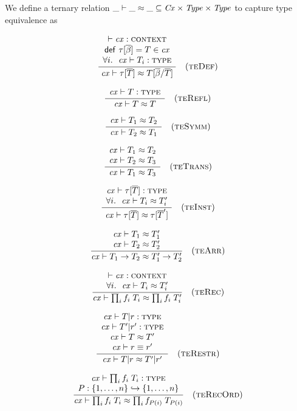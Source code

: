 We define a ternary relation $\ternrel{\teqY}{\Cx}{\Typ}{\Typ}$ to capture
type equivalence as

\[
\rruleIII
 {\cxwfO}
 {\tdefO\in\cx}
 {\FORALL{i}{\istyO{\typ_i}}}
 {\teqO{\tinstO}{\tsbslash{\typ}{\tvarS}{\typS}}}
 {\Rtedef}
\]

\[
\rruleI
 {\istyO{\typ}}
 {\teqO{\typ}{\typ}}
 {\Rterefl}
\]


\[
\rruleI
 {\teqO{\typ_1}{\typ_2}}
 {\teqO{\typ_2}{\typ_1}}
 {\Rtesymm}
\]

\[
\rruleII
 {\teqO{\typ_1}{\typ_2}}
 {\teqO{\typ_2}{\typ_3}}
 {\teqO{\typ_1}{\typ_3}}
 {\Rtetrans}
\]


\[
\rruleII
 {\istyO{\tinstO}}
 {\FORALL{i}{\teqO{\typ_i}{\typ_i'}}}
 {\teqO{\tinstO}{\tinst{\tnam}{\typS'}}}
 {\Rteinst}
\]

\[
\rruleII
 {\teqO{\typ_1}{\typ_1'}}
 {\teqO{\typ_2}{\typ_2'}}
 {\teqO{\tarr{\typ_1}{\typ_2}}{\tarr{\typ_1'}{\typ_2'}}}
 {\Rtearr}
\]

\[
\rruleII
 {\cxwfO}
 {\FORALL{i}{\teqO{\typ_i}{\typ_i'}}}
 {\teqO{\trecO}{\trec{i}{\fnam_i}{\typ_i'}}}
 {\Rterec}
\]


\[
\rruleIV
 {\istyO{\tsubO}}
 {\istyO{\tsub{\typ'}{\tspred'}}}
 {\teqO{\typ}{\typ'}}
 {\theoO{\eq{\tspred}{\tspred'}}}
 {\teqO{\tsubO}{\tsub{\typ'}{\tspred'}}}
 {\Rterestr}
\]


\[
\rruleII
 {\istyO{\trecO}}
 {\funcinj{\perm}{\setFT{1}{n}}{\setFT{1}{n}}}
 {\teqO{\trecO}{\trec{i}{\fnam_{\perm(i)}}{\typ_{\perm(i)}}}}
 {\Rterecord}
\]


